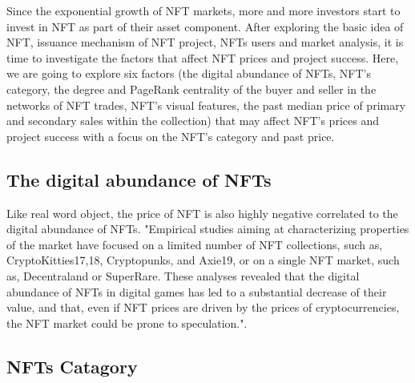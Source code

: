 Since the exponential growth of NFT markets, more and more investors start to invest in NFT as part of their asset component. After exploring the basic idea of NFT, issuance mechanism of NFT project, NFTs users and market analysis, it is time to investigate the factors that affect NFT prices and project success. Here, we are going to explore six factors (the digital abundance of NFTs, NFT’s category, the degree and PageRank centrality of the buyer and seller in the networks of NFT trades, NFT’s visual features, the past median price of primary and secondary sales within the collection) that may affect NFT’s prices and project success with a focus on the NFT’s category and past price.


\subsection{The digital abundance of NFTs}

Like real word object, the price of NFT is also highly negative correlated to the digital abundance of NFTs.
"Empirical studies aiming at characterizing properties of the market have focused on a limited number of NFT collections, such as, CryptoKitties17,18, Cryptopunks, and Axie19, or on a single NFT market, such as, Decentraland or SuperRare. These analyses revealed that the digital abundance of NFTs in digital games has led to a substantial decrease of their value, and that, even if NFT prices are driven by the prices of cryptocurrencies, the NFT market could be prone to speculation."\cite{nadini2021mapping}.

\subsection{NFTs Catagory}

